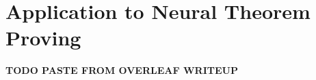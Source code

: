 \chapter{Application to Neural Theorem Proving}\label{chap:application}
\textbf{TODO PASTE FROM OVERLEAF WRITEUP}






